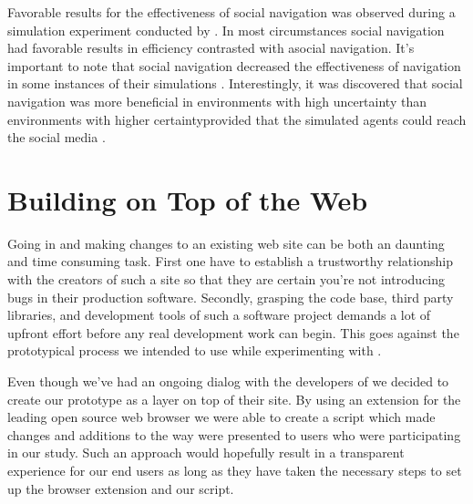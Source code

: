 Favorable results for the effectiveness of social navigation was observed
during a simulation experiment conducted by \citeauthor{riedl03}. In most
circumstances social navigation had favorable results in efficiency contrasted
with asocial navigation. It's important to note that social navigation
decreased the effectiveness of navigation in some instances of their
simulations \citeyearpar[p.~365]{riedl03}.
Interestingly, it was discovered that social navigation was more
beneficial in environments with high uncertainty%
than environments with higher certainty\dash{}provided that the
simulated agents could reach the social media
\citeyearpar[p.~368]{riedl03}. 

\section{Building on Top of the Web}
\label{section:building.on.top.of.the.web}

Going in and making changes to an existing web site can be both an
daunting and time consuming task. First one have to establish a trustworthy
relationship with the creators of such a site so that they are certain
you're not introducing bugs in their production software. Secondly, grasping
the code base, third party libraries, and development tools of such a software
project demands a lot of upfront effort before any real development work can
begin. This goes against the prototypical process we intended to use while
experimenting with \urort{}.

Even though we've had an ongoing dialog with the developers of \urort{} we
decided to create our prototype as a layer on top of their site.
By using an
extension
for the leading open source%
web browser we were able to create a script which
made changes and additions to the way \urort{}
were presented to users who were participating in our study.
Such an approach would hopefully result in a transparent experience for our
end users as long as they have taken the necessary steps to set up the browser
extension and our script.


